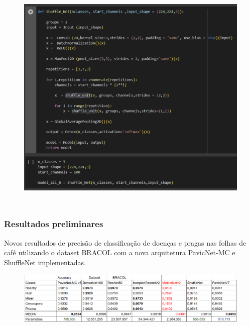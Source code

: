 \documentclass[aspectratio=169]{beamer}
\begin{document}
\begin{frame}
\begin{columns}
        \vspace{-30px}
        \begin{figure}
            \centering
            \includegraphics[scale = 0.4]{img/shufflwMain.png}
            \label{fig:enter-label}
        \end{figure}



    \end{columns}

\end{frame}











\begin{frame}
    \frametitle{Resultados preliminares}

    \centering
    Novos resultados de precisão de classificação de doenças e pragas nas folhas de café utilizando o dataset BRACOL com a nova arquitetura PavicNet-MC e ShuffleNet implementadas.

    \begin{figure}
        \centering
        \includegraphics[scale = 0.62]{img/novosResultsPavicEShuffle.png}
        \label{fig:enter-label}
    \end{figure}



\end{frame}
\end{document}
